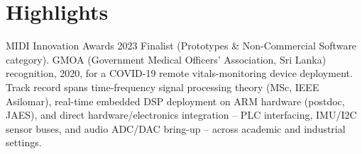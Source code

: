 \documentclass[11pt]{article}
\begin{document}
\section*{Highlights}
MIDI Innovation Awards 2023 Finalist (Prototypes \& Non-Commercial Software category). GMOA (Government Medical Officers' Association, Sri Lanka) recognition, 2020, for a COVID-19 remote vitals-monitoring device deployment. Track record spans time-frequency signal processing theory (MSc, IEEE Asilomar), real-time embedded DSP deployment on ARM hardware (postdoc, JAES), and direct hardware/electronics integration -- PLC interfacing, IMU/I2C sensor buses, and audio ADC/DAC bring-up -- across academic and industrial settings.
\end{document}

